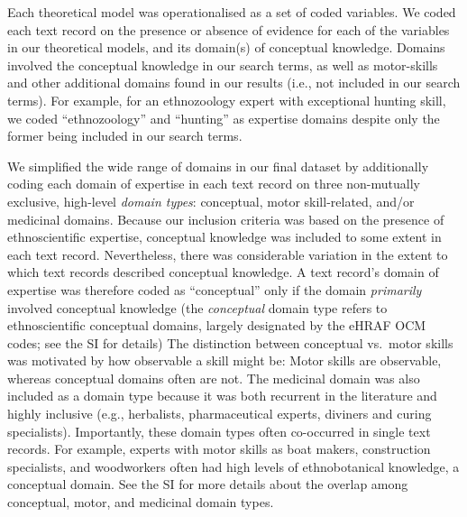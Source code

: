 \documentclass[
  11pt,
]{article}
\begin{document}
Each theoretical model was operationalised as a set of coded variables. We coded each text record on the presence or absence of evidence for each of the variables in our theoretical models, and its domain(s) of conceptual knowledge. Domains involved the conceptual knowledge in our search terms, as well as motor-skills and other additional domains found in our results (i.e., not included in our search terms). For example, for an ethnozoology expert with exceptional hunting skill, we coded ``ethnozoology'' and ``hunting'' as expertise domains despite only the former being included in our search terms.

We simplified the wide range of domains in our final dataset by additionally coding each domain of expertise in each text record on three non-mutually exclusive, high-level \emph{domain types}: conceptual, motor skill-related, and/or medicinal domains. Because our inclusion criteria was based on the presence of ethnoscientific expertise, conceptual knowledge was included to some extent in each text record. Nevertheless, there was considerable variation in the extent to which text records described conceptual knowledge. A text record's domain of expertise was therefore coded as ``conceptual'' only if the domain \emph{primarily} involved conceptual knowledge (the \emph{conceptual} domain type refers to ethnoscientific conceptual domains, largely designated by the eHRAF OCM codes; see the SI for details) The distinction between conceptual vs.~motor skills was motivated by how observable a skill might be: Motor skills are observable, whereas conceptual domains often are not. The medicinal domain was also included as a domain type because it was both recurrent in the literature and highly inclusive (e.g., herbalists, pharmaceutical experts, diviners and curing specialists). Importantly, these domain types often co-occurred in single text records. For example, experts with motor skills as boat makers, construction specialists, and woodworkers often had high levels of ethnobotanical knowledge, a conceptual domain. See the SI for more details about the overlap among conceptual, motor, and medicinal domain types.
\end{document}
